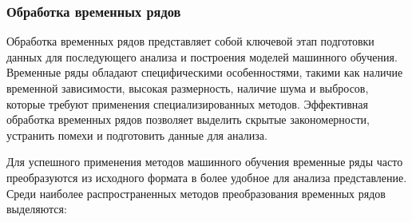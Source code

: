 \documentclass[spec, och, diploma]{SCWorks}
\begin{document}
        \subsubsection{Обработка временных рядов}

            Обработка временных рядов представляет собой ключевой этап
            подготовки данных для последующего анализа и построения моделей
            машинного обучения. Временные ряды обладают специфическими
            особенностями, такими как наличие временной зависимости, высокая
            размерность, наличие шума и выбросов, которые требуют применения
            специализированных методов. Эффективная обработка временных рядов
            позволяет выделить скрытые закономерности, устранить помехи и
            подготовить данные для анализа.

            Для успешного применения методов машинного обучения временные ряды
            часто преобразуются из исходного формата в более удобное для анализа
            представление. Среди наиболее распространенных методов
            преобразования временных рядов выделяются:
\end{document}
